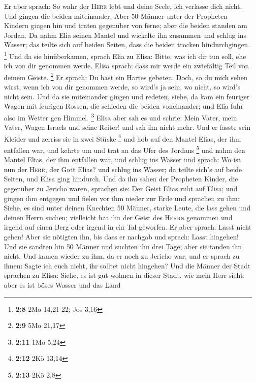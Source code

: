 Er aber sprach: So wahr der \textsc{Herr} lebt und deine Seele, ich
verlasse dich nicht. Und gingen die beiden miteinander. 
Aber 50 Männer unter der Propheten Kindern gingen hin und traten
gegenüber von ferne; aber die beiden standen am Jordan. 
Da nahm Elia seinen Mantel und wickelte ihn zusammen und schlug ins
Wasser; das teilte sich auf beiden Seiten, dass die beiden trocken
hindurchgingen. \footnote{\textbf{2:8} 2Mo 14,21-22; Jos 3,16}
 Und da sie hinüberkamen, sprach Elia zu Elisa: Bitte, was
ich dir tun soll, ehe ich von dir genommen werde. Elisa sprach: dass mir
werde ein zwiefältig Teil von deinem Geiste. \footnote{\textbf{2:9} 5Mo
  21,17}  Er sprach: Du hast ein Hartes gebeten. Doch, so
du mich sehen wirst, wenn ich von dir genommen werde, so wird's ja sein;
wo nicht, so wird's nicht sein.  Und da sie miteinander
gingen und redeten, siehe, da kam ein feuriger Wagen mit feurigen
Rossen, die schieden die beiden voneinander; und Elia fuhr also im
Wetter gen Himmel. \footnote{\textbf{2:11} 1Mo 5,24} 
Elisa aber sah es und schrie: Mein Vater, mein Vater, Wagen Israels und
seine Reiter! und sah ihn nicht mehr. Und er fasste sein Kleider und
zerriss sie in zwei Stücke \footnote{\textbf{2:12} 2Kö 13,14}
 und hob auf den Mantel Elias, der ihm entfallen war, und
kehrte um und trat an das Ufer des Jordans \footnote{\textbf{2:13} 2Kö
  2,8}  und nahm den Mantel Elias, der ihm entfallen war,
und schlug ins Wasser und sprach: Wo ist nun der \textsc{Herr}, der Gott
Elias? und schlug ins Wasser; da teilte sich's auf beide Seiten, und
Elisa ging hindurch.  Und da ihn sahen der Propheten
Kinder, die gegenüber zu Jericho waren, sprachen sie: Der Geist Elias
ruht auf Elisa; und gingen ihm entgegen und fielen vor ihm nieder zur
Erde  und sprachen zu ihm: Siehe, es sind unter deinen
Knechten 50 Männer, starke Leute, die lass gehen und deinen Herrn
suchen; vielleicht hat ihn der Geist des \textsc{Herrn} genommen und
irgend auf einen Berg oder irgend in ein Tal geworfen. Er aber sprach:
Lasst nicht gehen!  Aber sie nötigten ihn, bis dass er
nachgab und sprach: Lasst hingehen! Und sie sandten hin 50 Männer und
suchten ihn drei Tage; aber sie fanden ihn nicht.  Und
kamen wieder zu ihm, da er noch zu Jericho war; und er sprach zu ihnen:
Sagte ich euch nicht, ihr solltet nicht hingehen?  Und
die Männer der Stadt sprachen zu Elisa: Siehe, es ist gut wohnen in
dieser Stadt, wie mein Herr sieht; aber es ist böses Wasser und das Land
